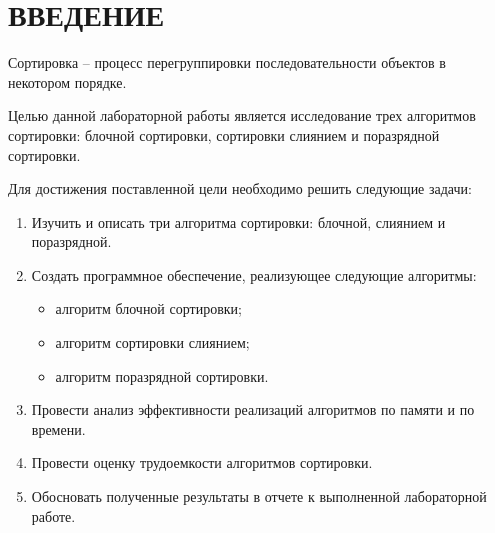 \chapter*{ВВЕДЕНИЕ}

Сортировка -- процесс перегруппировки последовательности объектов в некотором порядке. 

Целью данной лабораторной работы является исследование трех алгоритмов сортировки: блочной сортировки, сортировки слиянием и поразрядной сортировки.

Для достижения поставленной цели необходимо решить следующие задачи:

\begin{enumerate}[label={\arabic*)}]
	\item Изучить и описать три алгоритма сортировки: блочной, слиянием и поразрядной.
	\item Создать программное обеспечение, реализующее следующие алгоритмы:
	\begin{itemize}[label=--]
		\item алгоритм блочной сортировки;
		\item алгоритм сортировки слиянием;
		\item алгоритм поразрядной сортировки.
	\end{itemize}

	\item Провести анализ эффективности реализаций алгоритмов по памяти и по времени.
	\item Провести оценку трудоемкости алгоритмов сортировки.
	\item Обосновать полученные результаты в отчете к выполненной лабораторной работе.
\end{enumerate}

